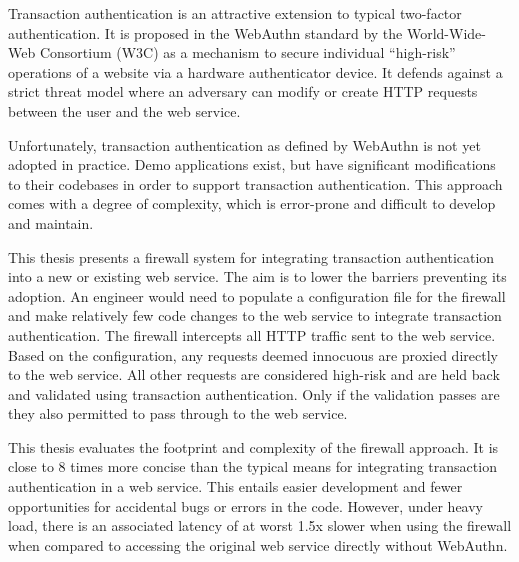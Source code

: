 % 
% 
%

\iffalse
by requiring attestation from a hardware authenticator device. 

may have complete control of all infrastructure components: the host computer, operating system, web-browser, network, etc. 
\fi


Transaction authentication is an attractive extension to typical two-factor authentication. It is proposed in the WebAuthn standard by the World-Wide-Web Consortium (W3C) as a mechanism to secure individual ``high-risk'' operations of a website via a hardware authenticator device. It defends against a strict threat model where an adversary can modify or create HTTP requests between the user and the web service.

Unfortunately, transaction authentication as defined by WebAuthn is not yet adopted in practice. Demo applications exist, but have significant modifications to their codebases in order to support transaction authentication. This approach comes with a degree of complexity, which is error-prone and difficult to develop and maintain.


This thesis presents a firewall system for integrating transaction authentication into a new or existing web service. The aim is to lower the barriers preventing its adoption. An engineer would need to populate a configuration file for the firewall and make relatively few code changes to the web service to integrate transaction authentication. The firewall intercepts all HTTP traffic sent to the web service. Based on the configuration, any requests deemed innocuous are proxied directly to the web service. All other requests are considered high-risk and are held back and validated using transaction authentication. Only if the validation passes are they also permitted to pass through to the web service.

This thesis evaluates the footprint and complexity of the firewall approach. It is close to 8 times more concise than the typical means for integrating transaction authentication in a web service. This entails easier development and fewer opportunities for accidental bugs or errors in the code. However, under heavy load, there is an associated latency of at worst 1.5x slower when using the firewall when compared to accessing the original web service directly without WebAuthn.
